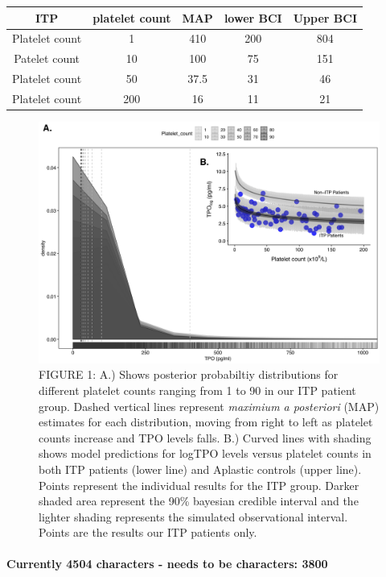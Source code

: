 \documentclass[11pt]{article}
\begin{document}
\begin{center}
 \begin{tabular}{||c c c c c||}
 \hline\hline
  ITP   & platelet count & MAP & lower BCI & Upper BCI  \\
\hline\hline
 Platelet count & 1 & 410 & 200  & 804 \\
 \hline
 Patelet count & 10 & 100 &  75 & 151 \\
 \hline
 Platelet count & 50 & 37.5 & 31 & 46 \\
 \hline
 Platelet count & 200 & 16 & 11 & 21 \\ [1ex]
 \hline
\end{tabular}
\end{center}

\begin{figure}
\includegraphics[]{ABSTRACT_v3_graph1.png}
\caption{FIGURE 1: A.) Shows posterior probabiltiy distributions for different platelet counts ranging from 1 to 90 in our ITP patient group. Dashed vertical lines represent \textit{maximium a posteriori} (MAP) estimates for each distribution, moving from right to left as platelet counts increase and TPO levels falls. B.) Curved lines with shading shows model predictions for logTPO levels versus platelet counts in both ITP patients (lower line) and Aplastic controls (upper line). Points represent the individual results for the ITP group. Darker shaded area represent the 90\% bayesian credible interval and the lighter shading represents the simulated observational interval. Points are the results our ITP patients only.}
\end{figure}





\paragraph{}
\textbf{Currently 4504 characters - needs to be characters: 3800}
\end{document}
